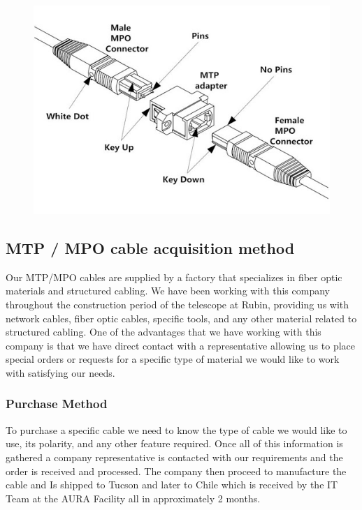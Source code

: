 \begin{figure}
  \includegraphics[width=\textwidth]{images/9.jpg}
  \label{fig:jlsimon}
\end{figure}


\subsection{MTP / MPO cable acquisition method}


Our MTP/MPO cables are supplied by a factory that specializes in fiber optic materials and structured cabling. We have been working with this company throughout the construction period of the telescope at Rubin, providing us with network cables, fiber optic cables, specific tools, and any other material related to structured cabling. One of the advantages that we have working with this company is that we have direct contact with a representative allowing us to place special orders or requests for a specific type of material we would like to work with satisfying our needs.


\subsubsection{Purchase Method}

To purchase a specific cable we need to know the type of cable we would like to use, its polarity, and any other feature required. Once all of this information is gathered a company representative is contacted with our requirements and the order is received and processed. The company then proceed to manufacture the cable and Is shipped to Tucson and later to Chile which is received by the IT Team at the AURA Facility all in approximately 2 months.

